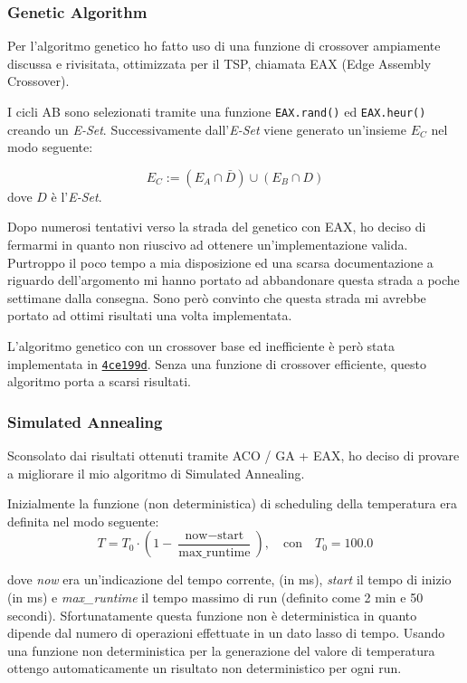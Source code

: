 \documentclass{article}
\newcommand{\mvar}[1]{\textrm{\textit{#1}}}
\newcommand{\ic}[1]{\texttt{#1}}
\begin{document}
\subsubsection{Genetic Algorithm}
Per l'algoritmo genetico ho fatto uso di una funzione di crossover ampiamente
discussa e rivisitata, ottimizzata per il TSP, chiamata EAX (Edge Assembly
Crossover).

I cicli AB sono selezionati tramite una funzione \ic{EAX.rand()} ed
\ic{EAX.heur()} creando un \mvar{E-Set}.
Successivamente dall'\mvar{E-Set} viene generato un'insieme $E_C$ nel modo seguente:

\begin{equation}
    E_C := (E_A \cap \bar{D}) \cup (E_B \cap D)
\end{equation}
dove $D$ è l'\mvar{E-Set}.

Dopo numerosi tentativi verso la strada del genetico con EAX, ho deciso di
fermarmi in quanto non riuscivo ad ottenere un'implementazione valida.
Purtroppo il poco tempo a mia disposizione ed una scarsa documentazione a riguardo
dell'argomento mi hanno portato ad abbandonare questa strada a poche settimane dalla
consegna. Sono però convinto che questa strada mi avrebbe portato
ad ottimi risultati una volta implementata.

L'algoritmo genetico con un crossover base ed inefficiente è però stata implementata
in \href{https://github.com/denysvitali/tsp-cup-2019/tree/4ce199dcb53d31f20663dbe6c4eaf4bffd1222de}{\texttt{4ce199d}}.
Senza una funzione di crossover efficiente, questo algoritmo porta a scarsi risultati.
\subsubsection{Simulated Annealing}
Sconsolato dai risultati ottenuti tramite ACO / GA + EAX, ho deciso di provare a migliorare
il mio algoritmo di Simulated Annealing.

Inizialmente la funzione (non deterministica) di scheduling della temperatura
era definita nel modo seguente:
\begin{equation}
    T = T_0 \cdot (1 - \dfrac{\text{now} - \text{start}}{\text{max\_runtime}})
    , \quad \text{con} \quad T_0 = 100.0
\end{equation}

dove \textit{now} era un'indicazione del tempo corrente,
 (in ms), \textit{start} il tempo di inizio (in ms) e \textit{max\_runtime}
 il tempo massimo di run (definito come 2 min e 50 secondi).
Sfortunatamente questa funzione non è deterministica in quanto dipende dal numero
di operazioni effettuate in un dato lasso di tempo.
Usando una funzione non deterministica per la generazione del valore di temperatura
ottengo automaticamente un risultato non deterministico per ogni run.
\end{document}
